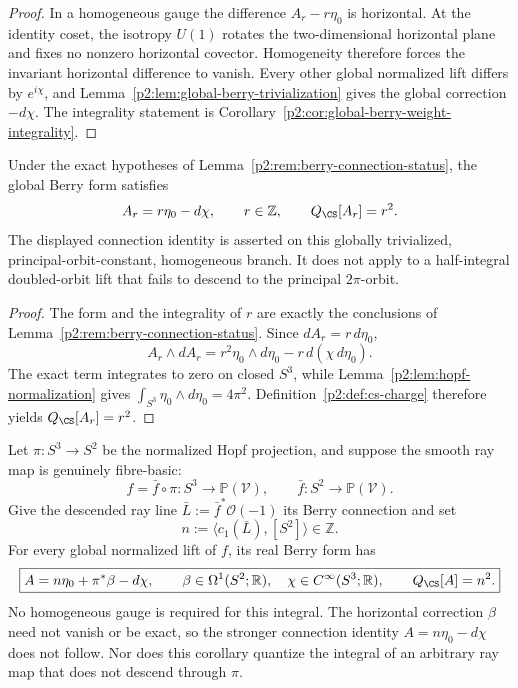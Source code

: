 \documentclass[11pt,a4paper]{article}
\begin{document}
\begin{proof}
In a homogeneous gauge the difference \(A_r-r\eta_0\) is horizontal.  At the
identity coset, the isotropy \(U(1)\) rotates the two-dimensional horizontal
plane and fixes no nonzero horizontal covector.  Homogeneity therefore forces
the invariant horizontal difference to vanish.  Every other global normalized
lift differs by \(e^{i\chi}\), and
Lemma~\ref{p2:lem:global-berry-trivialization} gives the global correction
\(-d\chi\).  The integrality statement is
Corollary~\ref{p2:cor:global-berry-weight-integrality}.
\end{proof}

\begin{corollary}
\label{p2d:cor:global-homogeneous-berry-normalization}
Under the exact hypotheses of
Lemma~\ref{p2:rem:berry-connection-status}, the global Berry form satisfies
\begin{equation}
\label{p2:eq:cs-q0}
 A_r=r\eta_0-d\chi,
 \qquad r\in\mathbb Z,
 \qquad Q_{\CS}[A_r]=r^2.
\end{equation}
The displayed connection identity is asserted on this globally trivialized,
principal-orbit-constant, homogeneous branch.  It
does not apply to a half-integral doubled-orbit lift that fails to descend to
the principal \(2\pi\)-orbit.
\end{corollary}

\begin{proof}
The form and the integrality of \(r\) are exactly the conclusions of
Lemma~\ref{p2:rem:berry-connection-status}.  Since
\(dA_r=r\,d\eta_0\),
\[
 A_r\wedge dA_r
 =r^2\eta_0\wedge d\eta_0-r\,d(\chi\,d\eta_0).
\]
The exact term integrates to zero on closed \(S^3\), while
Lemma~\ref{p2:lem:hopf-normalization} gives
\(\int_{S^3}\eta_0\wedge d\eta_0=4\pi^2\).  Definition~\ref{p2:def:cs-charge}
therefore yields \(Q_{\CS}[A_r]=r^2\).
\end{proof}

\begin{corollary}
\label{p2d:cor:fibre-basic-berry-cs}
Let \(\pi:S^3\to S^2\) be the normalized Hopf projection, and suppose the
smooth ray map is genuinely fibre-basic:
\[
 f=\bar f\circ\pi:S^3\longrightarrow\mathbb P(\mathcal V),\qquad
 \bar f:S^2\longrightarrow\mathbb P(\mathcal V).
\]
Give the descended ray line \(\bar L:=\bar f^*\mathcal O(-1)\) its Berry
connection and set
\[
 n:=\langle c_1(\bar L),[S^2]\rangle\in\mathbb Z.
\]
For every global normalized lift of \(f\), its real Berry form has
\[
 \boxed{A=n\eta_0+\pi^*\beta-d\chi,\qquad
 \beta\in\Omega^1(S^2;\mathbb R),\quad
 \chi\in C^\infty(S^3;\mathbb R),\qquad
 Q_{\CS}[A]=n^2.}
\]
No homogeneous gauge is required for this integral.  The horizontal
correction \(\beta\) need not vanish or be exact, so the stronger
connection identity \(A=n\eta_0-d\chi\) does not follow.  Nor does this
corollary quantize the integral of an arbitrary ray map that does not
descend through \(\pi\).
\end{corollary}
\end{document}
